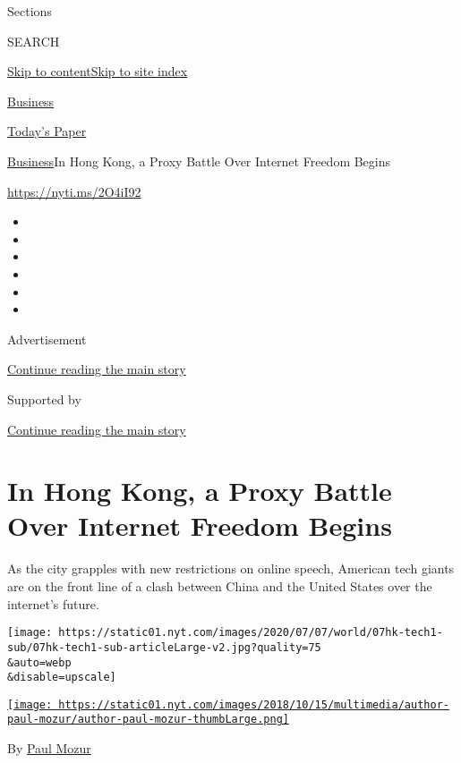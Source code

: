 Sections

SEARCH

\protect\hyperlink{site-content}{Skip to
content}\protect\hyperlink{site-index}{Skip to site index}

\href{https://www.nytimes.com/section/business}{Business}

\href{https://myaccount.nytimes.com/auth/login?response_type=cookie\&client_id=vi}{}

\href{https://www.nytimes.com/section/todayspaper}{Today's Paper}

\href{/section/business}{Business}\textbar{}In Hong Kong, a Proxy Battle
Over Internet Freedom Begins

\url{https://nyti.ms/2O4iI92}

\begin{itemize}
\item
\item
\item
\item
\item
\item
\end{itemize}

Advertisement

\protect\hyperlink{after-top}{Continue reading the main story}

Supported by

\protect\hyperlink{after-sponsor}{Continue reading the main story}

\hypertarget{in-hong-kong-a-proxy-battle-over-internet-freedom-begins}{%
\section{In Hong Kong, a Proxy Battle Over Internet Freedom
Begins}\label{in-hong-kong-a-proxy-battle-over-internet-freedom-begins}}

As the city grapples with new restrictions on online speech, American
tech giants are on the front line of a clash between China and the
United States over the internet's future.

\texttt{[image: https://static01.nyt.com/images/2020/07/07/world/07hk-tech1-sub/07hk-tech1-sub-articleLarge-v2.jpg?quality=75\\\&auto=webp\\\&disable=upscale]}

\href{https://www.nytimes.com/by/paul-mozur}{\texttt{[image: https://static01.nyt.com/images/2018/10/15/multimedia/author-paul-mozur/author-paul-mozur-thumbLarge.png]}}

By \href{https://www.nytimes.com/by/paul-mozur}{Paul Mozur}

